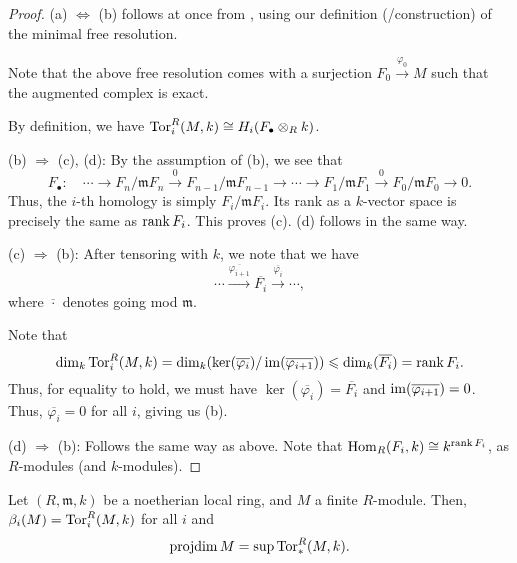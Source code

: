 \documentclass[12pt]{article}
\begin{document}
\begin{proof} 
	(a) $\Leftrightarrow$ (b) follows at once from , using our definition (/construction) of the minimal free resolution.

	Note that the above free resolution comes with a surjection $F_{0} \xrightarrow{\varphi_{0}} M$ such that the augmented complex is exact. 

	By definition, we have $\operatorname{Tor}^{R}_{i}(M, k) \cong H_{i}(F_{\bullet} \otimes_{R} k)$. \newline
	
	(b) $\Rightarrow$ (c), (d):  By the assumption of (b), we see that
	\begin{equation*} 
		F_{\bullet} : \quad \cdots \to F_{n}/\mathfrak{m} F_{n} \xrightarrow{0} F_{n - 1}/\mathfrak{m} F_{n - 1} \to \cdots \to F_{1}/\mathfrak{m} F_{1} \xrightarrow{0} F_{0}/\mathfrak{m} F_{0} \to 0.
	\end{equation*}
	Thus, the $i$-th homology is simply $F_{i}/\mathfrak{m} F_{i}$. Its rank as a $k$-vector space is precisely the same as $\operatorname{rank} F_{i}$. This proves (c). (d) follows in the same way.

	(c) $\Rightarrow$ (b): After tensoring with $k$, we note that we have
	\begin{equation*} 
		\cdots \xrightarrow{\overline{\varphi_{i + 1}}} \overline{F_{i}} \xrightarrow{\overline{\varphi_{i}}} \cdots,
	\end{equation*}
	where $\overline{\cdot}$ denotes going mod $\mathfrak{m}$. 

	Note that 
	\begin{equation*} 
		\dim_{k} \operatorname{Tor}^{R}_{i}(M, k) = \dim_{k}(\ker(\overline{\varphi_{i}})/\operatorname{im}(\overline{\varphi_{i + 1}})) \leqslant \dim_{k}(\overline{F_{i}}) = \operatorname{rank} F_{i}.
	\end{equation*}
	Thus, for equality to hold, we must have $\ker(\overline{\varphi_{i}}) = \overline{F_{i}}$ and $\operatorname{im}(\overline{\varphi_{i + 1}}) = 0$. Thus, $\overline{\varphi_{i}} = 0$ for all $i$, giving us (b).

	(d) $\Rightarrow$ (b): Follows the same way as above. Note that $\operatorname{Hom}_{R}(F_{i}, k) \cong k^{\operatorname{rank} F_{i}}$, as $R$-modules (and $k$-modules).
\end{proof}

\begin{cor} \label{cor:projdim-Tor-local}
	Let $(R, \mathfrak{m}, k)$ be a noetherian local ring, and $M$ a finite $R$-module. Then, $\beta_{i}(M) = \operatorname{Tor}^{R}_{i}(M, k)$ for all $i$ and
	\begin{equation*} 
		\operatorname{projdim} M = \sup \operatorname{Tor}^{R}_{\ast}(M, k).
	\end{equation*}
\end{cor}
\end{document}
